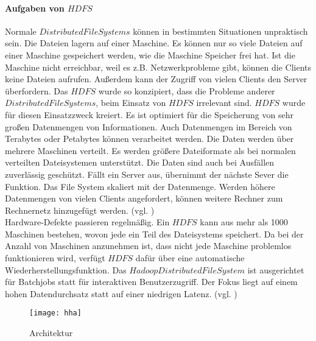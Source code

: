\paragraph{Aufgaben von $HDFS$}$\;$ \\
Normale $Distributed File Systems$ können in bestimmten Situationen unpraktisch sein. Die Dateien lagern auf einer Maschine. Es können nur so viele Dateien auf einer Maschine gespeichert werden, wie die Maschine Speicher frei hat. Ist die Maschine nicht erreichbar, weil es z.B. Netzwerkprobleme gibt, können die Clients keine Dateien aufrufen. Außerdem kann der Zugriff von vielen Clients den Server überfordern. Das $HDFS$ wurde so konzipiert, dass die Probleme anderer $Distributed File Systems$, beim Einsatz von $HDFS$ irrelevant sind. $HDFS$ wurde für diesen Einsatzzweck kreiert. Es ist optimiert für die Speicherung von sehr großen Datenmengen von Informationen. Auch Datenmengen im Bereich von Terabytes oder Petabytes können verarbeitet werden. Die Daten werden über mehrere Maschinen verteilt. Es werden größere Dateiformate als bei normalen verteilten Dateisystemen unterstützt. Die Daten sind auch bei Ausfällen zuverlässig geschützt. Fällt ein Server aus, übernimmt der nächste Sever die Funktion. Das File System skaliert mit der Datenmenge. Werden höhere Datenmengen von vielen Clients angefordert, können weitere Rechner zum Rechnernetz hinzugefügt werden. (vgl. \cite{yahoo})\\
Hardware-Defekte passieren regelmäßig. Ein $HDFS$ kann aus mehr als 1000 Maschinen bestehen, wovon jede ein Teil des Dateisystems speichert. Da bei der Anzahl von Maschinen anzunehmen ist, dass nicht jede Maschine problemlos funktionieren wird, verfügt $HDFS$ dafür über eine automatische Wiederherstellungsfunktion. Das $Hadoop Distributed File System$ ist ausgerichtet für Batchjobs statt für interaktiven Benutzerzugriff. Der Fokus liegt auf einem hohen Datendurchsatz statt auf einer niedrigen Latenz. (vgl. \cite{archguid})

\begin{figure}[h!]
    \centering
    \texttt{[image: hha]}
    \caption{Architektur\cite{uwes}}
    \label{fig:Architektur}
\end{figure}

